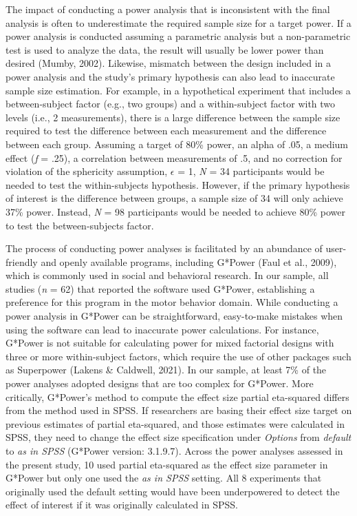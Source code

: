 \documentclass[
  doc, donotrepeattitle,floatsintext]{apa7}
\begin{document}
The impact of conducting a power analysis that is inconsistent with the final analysis is often to underestimate the required sample size for a target power. If a power analysis is conducted assuming a parametric analysis but a non-parametric test is used to analyze the data, the result will usually be lower power than desired (Mumby, 2002). Likewise, mismatch between the design included in a power analysis and the study's primary hypothesis can also lead to inaccurate sample size estimation. For example, in a hypothetical experiment that includes a between-subject factor (e.g., two groups) and a within-subject factor with two levels (i.e., 2 measurements), there is a large difference between the sample size required to test the difference between each measurement and the difference between each group. Assuming a target of 80\% power, an alpha of .05, a medium effect (\emph{f} = .25), a correlation between measurements of .5, and no correction for violation of the sphericity assumption, \(\epsilon\) = 1, \emph{N} = 34 participants would be needed to test the within-subjects hypothesis. However, if the primary hypothesis of interest is the difference between groups, a sample size of 34 will only achieve 37\% power. Instead, \emph{N} = 98 participants would be needed to achieve 80\% power to test the between-subjects factor.

The process of conducting power analyses is facilitated by an abundance of user-friendly and openly available programs, including G*Power (Faul et al., 2009), which is commonly used in social and behavioral research. In our sample, all studies (\emph{n} = 62) that reported the software used G*Power, establishing a preference for this program in the motor behavior domain. While conducting a power analysis in G*Power can be straightforward, easy-to-make mistakes when using the software can lead to inaccurate power calculations. For instance, G*Power is not suitable for calculating power for mixed factorial designs with three or more within-subject factors, which require the use of other packages such as Superpower (Lakens \& Caldwell, 2021). In our sample, at least 7\% of the power analyses adopted designs that are too complex for G*Power. More critically, G*Power's method to compute the effect size partial eta-squared differs from the method used in SPSS. If researchers are basing their effect size target on previous estimates of partial eta-squared, and those estimates were calculated in SPSS, they need to change the effect size specification under \emph{Options} from \emph{default} to \emph{as in SPSS} (G*Power version: 3.1.9.7). Across the power analyses assessed in the present study, 10 used partial eta-squared as the effect size parameter in G*Power but only one used the \emph{as in SPSS} setting. All 8 experiments that originally used the default setting would have been underpowered to detect the effect of interest if it was originally calculated in SPSS.
\end{document}

